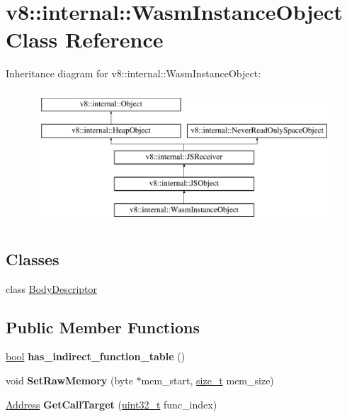 \hypertarget{classv8_1_1internal_1_1WasmInstanceObject}{}\section{v8\+:\+:internal\+:\+:Wasm\+Instance\+Object Class Reference}
\label{classv8_1_1internal_1_1WasmInstanceObject}
Inheritance diagram for v8\+:\+:internal\+:\+:Wasm\+Instance\+Object\+:\begin{figure}[H]
\begin{center}
\leavevmode
\includegraphics[height=5.000000cm]{classv8_1_1internal_1_1WasmInstanceObject}
\end{center}
\end{figure}
\subsection*{Classes}
\begin{DoxyCompactItemize}
\item 
class \mbox{\hyperlink{classv8_1_1internal_1_1WasmInstanceObject_1_1BodyDescriptor}{Body\+Descriptor}}
\end{DoxyCompactItemize}
\subsection*{Public Member Functions}
\begin{DoxyCompactItemize}
\item 
\mbox{\label{classv8_1_1internal_1_1WasmInstanceObject_a65ef21679e76e6c1be17d635ca4e5164}} 
\mbox{\hyperlink{classbool}{bool}} {\bfseries has\+\_\+indirect\+\_\+function\+\_\+table} ()
\item 
\mbox{\label{classv8_1_1internal_1_1WasmInstanceObject_a461d4467c48a0ccfa1fd0c25b7434ec2}} 
void {\bfseries Set\+Raw\+Memory} (byte $\ast$mem\+\_\+start, \mbox{\hyperlink{classsize__t}{size\+\_\+t}} mem\+\_\+size)
\item 
\mbox{\label{classv8_1_1internal_1_1WasmInstanceObject_a06900df0a356d93cc3da82a08947d7cf}} 
\mbox{\hyperlink{classuintptr__t}{Address}} {\bfseries Get\+Call\+Target} (\mbox{\hyperlink{classuint32__t}{uint32\+\_\+t}} func\+\_\+index)
\end{DoxyCompactItemize}
